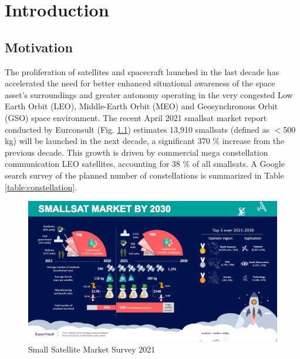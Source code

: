 \chapter{Introduction}\label{CHAP1}

\section{Motivation}\label{CHAP1_1}
The proliferation of satellites and spacecraft launched in the last decade has accelerated the need for better enhanced situational awareness of the space asset's surroundings and greater autonomy operating in the very congested Low Earth Orbit (LEO), Middle-Earth Orbit (MEO) and Geosynchronous Orbit (GSO) space environment. The recent April 2021 smallsat\footnotemark{} market report conducted by Eurconsult (Fig. \ref{fig:smallSatMarket}) estimates 13,910 smallsats (defined as $<$500 kg) will be launched in the next decade, a significant 370 \% increase from the previous decade. This growth is driven by commercial mega constellation communication LEO satellites, accounting for 38 \% of all smallsats. A Google search survey of the planned number of constellations is summarized in Table \ref{table:constellation}. 

\begin{figure}[ht]
    \centering
    \includegraphics[width=1\textwidth]{Figures/EuroconsultSmallSatMarketBy2030.PNG}
    \caption{Small Satellite Market Survey 2021 \cite{euroConsult21}}
    \label{fig:smallSatMarket}
\end{figure}

